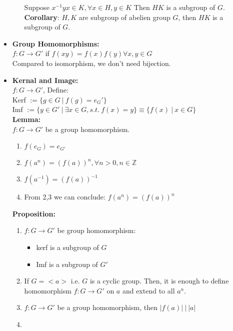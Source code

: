 \documentclass[12pt]{article}
\begin{document}
\begin{itemize}
\begin{enumerate}
            Suppose $x^{-1}yx\in K, \forall x\in H, y \in K$ Then $HK$ is a subgroup of $G$.\\
            \textbf{Corollary}: $H,K$ are subgroup of abelien group $G$, then $HK$ is a subgroup of $G$.
        \end{enumerate}
        \item \textbf{Group Homomorphisms:}\\
        $f: G \rightarrow G'$ if $f(xy) = f(x)f(y) \forall x,y \in G$\\
        Compared to isomorphism, we don't need bijection.
        \item \textbf{Kernal and Image:}\\
        $f: G \rightarrow G'$, Define:\\
        Kerf $:=\{g \in G \ | \ f(g) = e_G'\}$\\
        Imf $:= \{y \in G' \ | \ \exists x \in G, s.t. \ f(x) = y\} \equiv \{f(x) \ | \ x\in G\}$\\
        \textbf{Lemma:}\\
        $f: G \rightarrow G'$ be a group homomorphism.
        \begin{enumerate}
            \item $f(e_G) = e_{G'}$
            \item $f(a^n) = (f(a))^n, \forall n >0, n \in \mathbb{Z}$
            \item $f(a^{-1}) = (f(a))^{-1}$
            \item From 2,3 we can conclude: $f(a^n) = (f(a))^n$
        \end{enumerate}
        \textbf{Proposition:}
        \begin{enumerate}
            \item $f: G \rightarrow G'$ be group homomorphism:
            \begin{itemize}
                \item kerf is a subgroup of $G$
                \item Imf is a subgroup of $G'$
            \end{itemize}
            \item If $G = <a>$ i.e. $G$ is a cyclic group. Then, it is enough to define homomorphism $f:G\rightarrow G'$ on $a$ and extend to all $a^n$.
            \item $f: G\rightarrow G'$ be a group homomorphism, then $|f(a)| \ | \ |a|$
            \item 
        \end{enumerate}
    \end{itemize}
\end{document}
